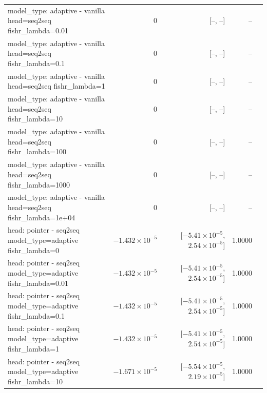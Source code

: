 \documentclass[10pt]{article}
\makeatletter
\newcommand{\stackcell}[1]{\begin{tabular}[t]{@{}l@{}}#1\end{tabular}}
\makeatother
\begin{document}
{\begin{longtable}{lrrrl}
\stackcell{model\_type: adaptive - vanilla\\\footnotesize head=seq2seq fishr\_lambda=0.01 } & 0 & [--, --] & -- & \\
\stackcell{model\_type: adaptive - vanilla\\\footnotesize head=seq2seq fishr\_lambda=0.1 } & 0 & [--, --] & -- & \\
\stackcell{model\_type: adaptive - vanilla\\\footnotesize head=seq2seq fishr\_lambda=1 } & 0 & [--, --] & -- & \\
\stackcell{model\_type: adaptive - vanilla\\\footnotesize head=seq2seq fishr\_lambda=10 } & 0 & [--, --] & -- & \\
\stackcell{model\_type: adaptive - vanilla\\\footnotesize head=seq2seq fishr\_lambda=100 } & 0 & [--, --] & -- & \\
\stackcell{model\_type: adaptive - vanilla\\\footnotesize head=seq2seq fishr\_lambda=1000 } & 0 & [--, --] & -- & \\
\stackcell{model\_type: adaptive - vanilla\\\footnotesize head=seq2seq fishr\_lambda=1e+04 } & 0 & [--, --] & -- & \\
\stackcell{head: pointer - seq2seq\\\footnotesize model\_type=adaptive fishr\_lambda=0 } & $-1.432\times10^{-5}$ & [$-5.41\times10^{-5}$, $2.54\times10^{-5}$] & 1.0000 & \\
\stackcell{head: pointer - seq2seq\\\footnotesize model\_type=adaptive fishr\_lambda=0.01 } & $-1.432\times10^{-5}$ & [$-5.41\times10^{-5}$, $2.54\times10^{-5}$] & 1.0000 & \\
\stackcell{head: pointer - seq2seq\\\footnotesize model\_type=adaptive fishr\_lambda=0.1 } & $-1.432\times10^{-5}$ & [$-5.41\times10^{-5}$, $2.54\times10^{-5}$] & 1.0000 & \\
\stackcell{head: pointer - seq2seq\\\footnotesize model\_type=adaptive fishr\_lambda=1 } & $-1.432\times10^{-5}$ & [$-5.41\times10^{-5}$, $2.54\times10^{-5}$] & 1.0000 & \\
\stackcell{head: pointer - seq2seq\\\footnotesize model\_type=adaptive fishr\_lambda=10 } & $-1.671\times10^{-5}$ & [$-5.54\times10^{-5}$, $2.19\times10^{-5}$] & 1.0000 & \\

\end{longtable}}
\end{document}
